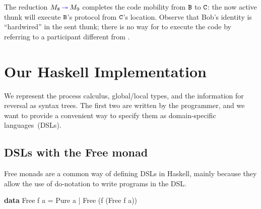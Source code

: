 \documentclass[runningheads,plain]{llncs}
\newcommand{\erase}[1]{\textcolor{orange}{#1}}
\newenvironment{Shaded}{}{}
\newcommand{\KeywordTok}[1]{\textcolor[rgb]{0.00,0.44,0.13}{\textbf{#1}}}
\newcommand{\DataTypeTok}[1]{\textcolor[rgb]{0.56,0.13,0.00}{#1}}
\newcommand{\FunctionTok}[1]{\textcolor[rgb]{0.02,0.16,0.49}{#1}}
\newcommand{\NormalTok}[1]{#1}
\begin{document}
The reduction $M_8 \textcolor{blue}{\,\twoheadrightarrow\,} M_9$ completes the code mobility from $\mathtt{B}$ to $\mathtt{C}$: the now active thunk
will execute $\mathtt{B}$'s protocol from $\mathtt{C}$'s location. Observe that Bob's identity \pB is ``hardwired'' in the sent thunk; 
there is no way for \pC to execute the code by referring to a participant different  from \pB.



\section{Our Haskell Implementation}
\label{implementing-the-ppdp17-calculus-in-haskell}

We represent the process calculus, global/local types, and the information for reversal as syntax trees. 
The first two are written by the programmer, and we want to provide a convenient way to specify them as domain-specific languages~(DSLs). 

\subsection{DSLs with the Free monad}

Free monads are a common way of defining DSLs in Haskell, mainly because they allow the use of do-notation to write programs in the DSL.
\begin{Shaded}
\begin{Highlighting}[]
\KeywordTok{data} \DataTypeTok{Free}\NormalTok{ f a   }
    \FunctionTok{=} \DataTypeTok{Pure}\NormalTok{ a    }
    \FunctionTok{|} \DataTypeTok{Free}\NormalTok{ (f (}\DataTypeTok{Free}\NormalTok{ f a))   }
\end{Highlighting}
\end{Shaded}
\end{document}
